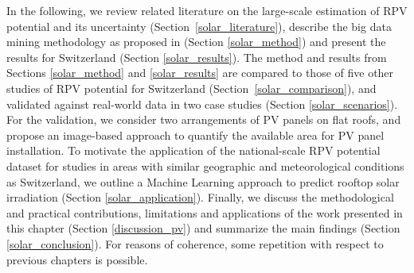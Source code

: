 In the following, we review related literature on the large-scale estimation of RPV potential and its uncertainty (Section~\ref{solar_literature}), describe the big data mining methodology as proposed in \cite{walch_big_2020} (Section \ref{solar_method}) and present the results for Switzerland (Section \ref{solar_results}).
The method and results from Sections \ref{solar_method} and \ref{solar_results} are compared to those of five other studies of RPV potential for Switzerland (Section~\ref{solar_comparison}), and validated against real-world data in two case studies (Section \ref{solar_scenarios}). 
For the validation, we consider 
two arrangements of PV panels on flat roofs, 
and propose an image-based approach to quantify the available area for PV panel installation. 
To motivate the application of the national-scale RPV potential dataset for studies in areas with similar geographic and meteorological conditions as Switzerland, we outline a Machine Learning approach to predict rooftop solar irradiation (Section \ref{solar_application}).
Finally, we discuss the methodological and practical contributions, limitations and applications of the work presented in this chapter (Section \ref{discussion_pv}) 
and summarize the main findings (Section \ref{solar_conclusion}).
For reasons of coherence, some repetition with respect to  previous chapters is possible.

